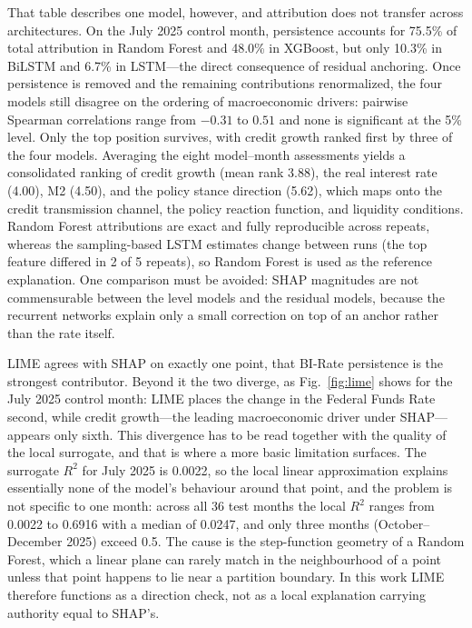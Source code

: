 \documentclass[conference]{IEEEtran}
\begin{document}
That table describes one model, however, and attribution does not transfer across architectures. On the July 2025 control month, persistence accounts for 75.5\% of total attribution in Random Forest and 48.0\% in XGBoost, but only 10.3\% in BiLSTM and 6.7\% in LSTM---the direct consequence of residual anchoring. Once persistence is removed and the remaining contributions renormalized, the four models still disagree on the ordering of macroeconomic drivers: pairwise Spearman correlations range from $-0.31$ to $0.51$ and none is significant at the 5\% level. Only the top position survives, with credit growth ranked first by three of the four models. Averaging the eight model--month assessments yields a consolidated ranking of credit growth (mean rank 3.88), the real interest rate (4.00), M2 (4.50), and the policy stance direction (5.62), which maps onto the credit transmission channel, the policy reaction function, and liquidity conditions. Random Forest attributions are exact and fully reproducible across repeats, whereas the sampling-based LSTM estimates change between runs (the top feature differed in 2 of 5 repeats), so Random Forest is used as the reference explanation. One comparison must be avoided: SHAP magnitudes are not commensurable between the level models and the residual models, because the recurrent networks explain only a small correction on top of an anchor rather than the rate itself.

LIME agrees with SHAP on exactly one point, that BI-Rate persistence is the strongest contributor. Beyond it the two diverge, as Fig.~\ref{fig:lime} shows for the July 2025 control month: LIME places the change in the Federal Funds Rate second, while credit growth---the leading macroeconomic driver under SHAP---appears only sixth. This divergence has to be read together with the quality of the local surrogate, and that is where a more basic limitation surfaces. The surrogate $R^2$ for July 2025 is 0.0022, so the local linear approximation explains essentially none of the model's behaviour around that point, and the problem is not specific to one month: across all 36 test months the local $R^2$ ranges from 0.0022 to 0.6916 with a median of 0.0247, and only three months (October--December 2025) exceed 0.5. The cause is the step-function geometry of a Random Forest, which a linear plane can rarely match in the neighbourhood of a point unless that point happens to lie near a partition boundary. In this work LIME therefore functions as a direction check, not as a local explanation carrying authority equal to SHAP's.
\end{document}
